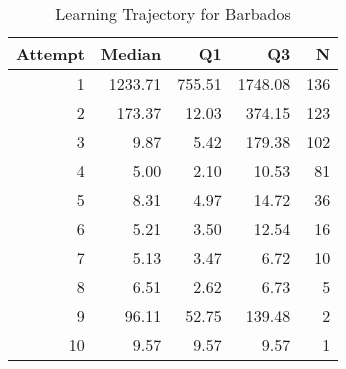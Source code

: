 \begin{table}[htbp]
\centering
\caption{Learning Trajectory for Barbados}
\label{tab:learning-trajectory}
\begin{tabular}{rrrrr}
\toprule
Attempt & Median & Q1 & Q3 & N \\
\midrule
1 & 1233.71 & 755.51 & 1748.08 & 136 \\
2 & 173.37 & 12.03 & 374.15 & 123 \\
3 & 9.87 & 5.42 & 179.38 & 102 \\
4 & 5.00 & 2.10 & 10.53 & 81 \\
5 & 8.31 & 4.97 & 14.72 & 36 \\
6 & 5.21 & 3.50 & 12.54 & 16 \\
7 & 5.13 & 3.47 & 6.72 & 10 \\
8 & 6.51 & 2.62 & 6.73 & 5 \\
9 & 96.11 & 52.75 & 139.48 & 2 \\
10 & 9.57 & 9.57 & 9.57 & 1 \\
\bottomrule
\end{tabular}
\end{table}
